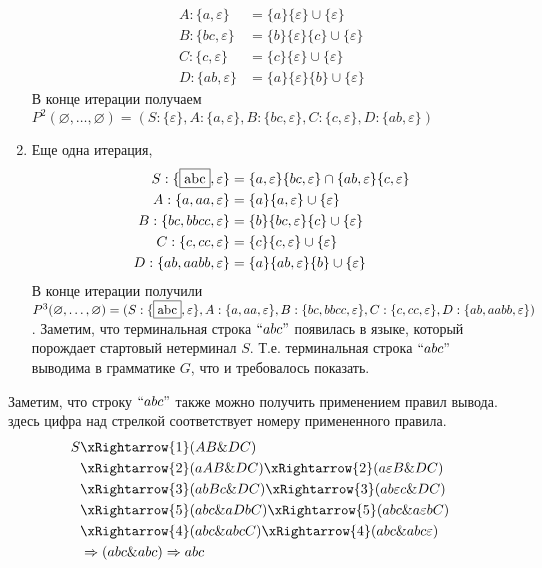 \begin{example}
\begin{enumerate}
\begin{align*}
        	A: \{a, \varepsilon\} &= \{a\}\{\varepsilon\} \cup \{\varepsilon\} \\ 
        	B: \{bc, \varepsilon\} &= \{b\}\{\varepsilon\}\{c\} \cup \{\varepsilon\} \\
        	C: \{c, \varepsilon\} &= \{c\}\{\varepsilon\} \cup \{\varepsilon\} \\ 
        	D: \{ab, \varepsilon\} &= \{a\}\{\varepsilon\}\{b\} \cup \{\varepsilon\}
    	\end{align*}
    	В конце итерации получаем $P^{2}(\varnothing,\ldots,\varnothing) = (S: \{\varepsilon\}, A: \{a, \varepsilon\}, B: \{bc, \varepsilon\}, C: \{c, \varepsilon\}, D: \{ab, \varepsilon\})$
    	\item Еще одна итерация,
    	\begin{align*}
        	S:  \{\fbox{abc}, \varepsilon\} &= \{a, \varepsilon\}\{bc, \varepsilon\} \cap \{ab, \varepsilon\}\{c, \varepsilon\} \\ 
        	A: \{a, aa, \varepsilon\} &= \{a\}\{a, \varepsilon\} \cup \{\varepsilon\} \\ 
        	B: \{bc, bbcc, \varepsilon\} &= \{b\}\{bc, \varepsilon\}\{c\} \cup \{\varepsilon\} \\
        	C: \{c, cc, \varepsilon\} &= \{c\}\{c, \varepsilon\} \cup \{\varepsilon\} \\ 
        	D: \{ab, aabb, \varepsilon\} &= \{a\}\{ab, \varepsilon\}\{b\} \cup \{\varepsilon\}
    	\end{align*}
    	В конце итерации получили $P^{3}(\varnothing,\ldots,\varnothing) = (S: \{\fbox{abc}, \varepsilon\}, A: \{a, aa, \varepsilon\}, B: \{bc, bbcc, \varepsilon\}, C: \{c, cc, \varepsilon\}, D: \{ab, aabb, \varepsilon\})$. Заметим, что терминальная строка $``abc"$ появилась в языке, который порождает стартовый нетерминал $S$. Т.е. терминальная строка $``abc"$ выводима в грамматике $G$, что и требовалось показать.
    \end{enumerate}
    
    Заметим, что строку $``abc"$ также можно получить применением правил вывода. здесь цифра над стрелкой соответствует номеру примененного правила. 
	\begin{align*}
    	S &\xRightarrow{1}(AB\&DC) \\
    	&\xRightarrow{2}(aAB\&DC) \xRightarrow{2} (a\varepsilon B\&DC) \\
    	&\xRightarrow{3}(abBc\&DC) \xRightarrow{3}(ab\varepsilon c\&DC) \\
    	&\xRightarrow{5}(abc\&aDbC) \xRightarrow{5}(abc\&a\varepsilon bC) \\
    	&\xRightarrow{4}(abc\&abcC) \xRightarrow{4}(abc\&abc\varepsilon) \\
    	&\Rightarrow(abc\&abc) \Rightarrow abc
	\end{align*}
\end{example}

